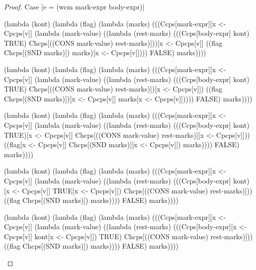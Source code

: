 \begin{proof}{Case \scheme|e = (wcm mark-expr body-expr)|}
\begin{schemeblock}
\begin{schemedisplay}
(lambda (kont)
  (lambda (flag)
    (lambda (marks)
      (((Ccps[mark-expr][x <- Cpcps[v]]
          (lambda (mark-value) 
            ((lambda (rest-marks) 
               (((Ccps[body-expr] kont) TRUE) Chcps[((CONS mark-value) rest-marks)]))[x <- Cpcps[v]]
             ((flag Chcps[(SND marks)]) marks)[x <- Cpcps[v]])))
        FALSE) marks))))
\end{schemedisplay}
\end{schemeblock}

\begin{schemeblock}
\begin{schemedisplay}
(lambda (kont)
  (lambda (flag)
    (lambda (marks)
      (((Ccps[mark-expr][x <- Cpcps[v]]
          (lambda (mark-value) 
            ((lambda (rest-marks) 
               (((Ccps[body-expr] kont) TRUE) Chcps[((CONS mark-value) rest-marks)])[x <- Cpcps[v]])
             ((flag Chcps[(SND marks)])[x <- Cpcps[v]] marks[x <- Cpcps[v]]))))
        FALSE) marks))))
\end{schemedisplay}
\end{schemeblock}

\begin{schemeblock}
\begin{schemedisplay}
(lambda (kont)
  (lambda (flag)
    (lambda (marks)
      (((Ccps[mark-expr][x <- Cpcps[v]]
          (lambda (mark-value) 
            ((lambda (rest-marks) 
               (((Ccps[body-expr] kont) TRUE)[x <- Cpcps[v]] Chcps[((CONS mark-value) rest-marks)][x <- Cpcps[v]]))
             ((flag[x <- Cpcps[v]] Chcps[(SND marks)][x <- Cpcps[v]]) marks))))
        FALSE) marks))))
\end{schemedisplay}
\end{schemeblock}

\begin{schemeblock}
\begin{schemedisplay}
(lambda (kont)
  (lambda (flag)
    (lambda (marks)
      (((Ccps[mark-expr][x <- Cpcps[v]]
          (lambda (mark-value) 
            ((lambda (rest-marks) 
               (((Ccps[body-expr] kont)[x <- Cpcps[v]] TRUE[x <- Cpcps[v]]) Chcps[((CONS mark-value) rest-marks)]))
             ((flag Chcps[(SND marks)]) marks))))
        FALSE) marks))))
\end{schemedisplay}
\end{schemeblock}

\begin{schemeblock}
\begin{schemedisplay}
(lambda (kont)
  (lambda (flag)
    (lambda (marks)
      (((Ccps[mark-expr][x <- Cpcps[v]]
          (lambda (mark-value) 
            ((lambda (rest-marks) 
               (((Ccps[body-expr][x <- Cpcps[v]] kont[x <- Cpcps[v]]) TRUE) Chcps[((CONS mark-value) rest-marks)]))
             ((flag Chcps[(SND marks)]) marks))))
        FALSE) marks))))
\end{schemedisplay}
\end{schemeblock}


\end{proof}

